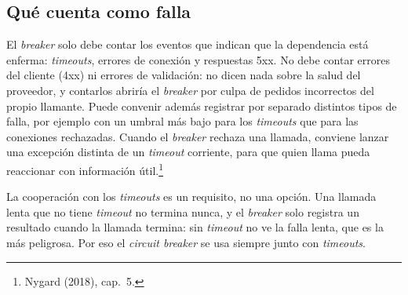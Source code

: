 \documentclass[variant=apuntes,cover=institutional,mode=screen]{ua-engineering-v6-article}
\begin{document}
\begin{center}
\end{center}

\subsection{Qué cuenta como falla}

El \emph{breaker} solo debe contar los eventos que indican que la dependencia está enferma: \emph{timeouts}, errores de conexión y respuestas 5xx. No debe contar errores del cliente (4xx) ni errores de validación: no dicen nada sobre la salud del proveedor, y contarlos abriría el \emph{breaker} por culpa de pedidos incorrectos del propio llamante. Puede convenir además registrar por separado distintos tipos de falla, por ejemplo con un umbral más bajo para los \emph{timeouts} que para las conexiones rechazadas. Cuando el \emph{breaker} rechaza una llamada, conviene lanzar una excepción distinta de un \emph{timeout} corriente, para que quien llama pueda reaccionar con información útil.\footnote{Nygard (2018), cap.~5.}

La cooperación con los \emph{timeouts} es un requisito, no una opción. Una llamada lenta que no tiene \emph{timeout} no termina nunca, y el \emph{breaker} solo registra un resultado cuando la llamada termina: sin \emph{timeout} no ve la falla lenta, que es la más peligrosa. Por eso el \emph{circuit breaker} se usa siempre junto con \emph{timeouts}.
\end{document}
